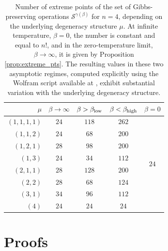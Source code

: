 \documentclass[11pt,a4paper,longbibliography]{amsart}
\numberwithin{equation}{section}
\theoremstyle{plain}
\theoremstyle{definition}
\theoremstyle{remark}
\begin{document}
			
			\begin{table}[ht]
				\centering
				\begin{tabular}{r|c|c|c|c}
					$\mu$ & $\beta \rightarrow \infty$ & $\beta > \beta_{\rm low}$ & $\beta < \beta_{\rm high}$ & $\beta = 0$   \\
					\hline
					$(1,1,1,1)$ & $24$ & $118$ & $262$ & \multirow{8}{*}{$24$} \\
					$(1,1,2)$ & $24$ & $68$ & $200$ &\\
					$(1,2,1)$ & $28$ & $98$ & $200$ & \\
					$(1,3)$ & $24$ & $34$ & $112$ & \\
					$(2,1,1)$ &  $28$ & $128$ & $200$ &\\
					$(2,2)$ & $28$ & $68$ & $124$ &\\
					$(3,1)$ & $34$ & $96$ & $112$ &\\
					$(4)$ & $24$ & $24$ & $24$ &
				\end{tabular}
				\caption{Number of extreme points of the set of Gibbs-preserving operations $\mathcal{S}^{\gamma(\beta)}$ for $n = 4$, depending on the underlying degeneracy structure $\mu$. At infinite temperature, $\beta = 0$, the number is constant and equal to $n!$, and in the zero-temperature limit, $\beta \rightarrow \infty$, it is given by Proposition \ref{prop:extreme_pts}. The resulting values in these two asymptotic regimes, computed explicitly using the Wolfram script available at \cite{github}, exhibit substantial variation with the underlying degeneracy structure.}
				\label{tab:num_points}
			\end{table}
			
			\section{Proofs}
			\label{sec:proofs}
			
\end{document}
